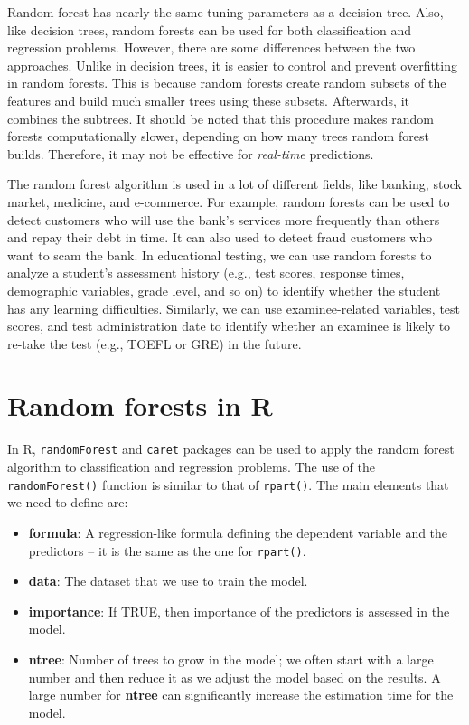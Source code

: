 \documentclass[]{book}
\providecommand{\tightlist}{%
  \setlength{\itemsep}{0pt}\setlength{\parskip}{0pt}}
\begin{document}
Random forest has nearly the same tuning parameters as a decision tree. Also, like decision trees, random forests can be used for both classification and regression problems. However, there are some differences between the two approaches. Unlike in decision trees, it is easier to control and prevent overfitting in random forests. This is because random forests create random subsets of the features and build much smaller trees using these subsets. Afterwards, it combines the subtrees. It should be noted that this procedure makes random forests computationally slower, depending on how many trees random forest builds. Therefore, it may not be effective for \emph{real-time} predictions.

The random forest algorithm is used in a lot of different fields, like banking, stock market, medicine, and e-commerce. For example, random forests can be used to detect customers who will use the bank's services more frequently than others and repay their debt in time. It can also used to detect fraud customers who want to scam the bank. In educational testing, we can use random forests to analyze a student's assessment history (e.g., test scores, response times, demographic variables, grade level, and so on) to identify whether the student has any learning difficulties. Similarly, we can use examinee-related variables, test scores, and test administration date to identify whether an examinee is likely to re-take the test (e.g., TOEFL or GRE) in the future.

\hypertarget{random-forests-in-r}{%
\section{Random forests in R}\label{random-forests-in-r}}

In R, \texttt{randomForest} and \texttt{caret} packages can be used to apply the random forest algorithm to classification and regression problems. The use of the \texttt{randomForest()} function is similar to that of \texttt{rpart()}. The main elements that we need to define are:

\begin{itemize}
\tightlist
\item
  \textbf{formula}: A regression-like formula defining the dependent variable and the predictors -- it is the same as the one for \texttt{rpart()}.
\item
  \textbf{data}: The dataset that we use to train the model.
\item
  \textbf{importance}: If TRUE, then importance of the predictors is assessed in the model.
\item
  \textbf{ntree}: Number of trees to grow in the model; we often start with a large number and then reduce it as we adjust the model based on the results. A large number for \textbf{ntree} can significantly increase the estimation time for the model.
\end{itemize}
\end{document}
